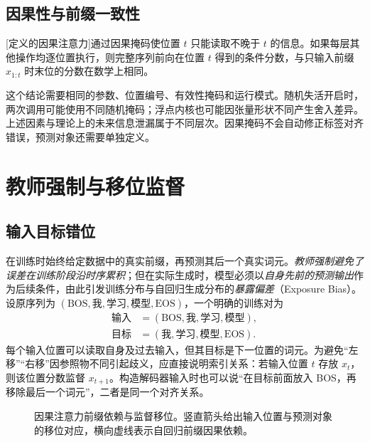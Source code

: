 \documentclass[../textbook.tex]{subfiles}
\begin{document}
\subsection{因果性与前缀一致性}
[定义的因果注意力]通过因果掩码使位置 $t$ 只能读取不晚于 $t$ 的信息。如果每层其他操作均逐位置执行，则完整序列前向在位置 $t$ 得到的条件分数，与只输入前缀 $x_{1:t}$ 时末位的分数在数学上相同。

这个结论需要相同的参数、位置编号、有效性掩码和运行模式。随机失活开启时，两次调用可能使用不同随机掩码；浮点内核也可能因张量形状不同产生舍入差异。上述因素与理论上的未来信息泄漏属于不同层次。因果掩码不会自动修正标签对齐错误，预测对象还需要单独定义。

\section{教师强制与移位监督}

\subsection{输入目标错位}
在训练时始终给定数据中的真实前缀，再预测其后一个真实词元。\emph{教师强制避免了误差在训练阶段沿时序累积}；但在实际生成时，模型必须以\emph{自身先前的预测输出}作为后续条件，由此引发训练分布与自回归生成分布的\emph{暴露偏差}（Exposure Bias）。设原序列为
$(\mathrm{BOS},\text{我},\text{学习},\text{模型},\mathrm{EOS})$，一个明确的训练对为
\begin{equation}
 \begin{aligned}
 \text{输入}&=(\mathrm{BOS},\text{我},\text{学习},\text{模型}),\\
 \text{目标}&=(\text{我},\text{学习},\text{模型},\mathrm{EOS}).
 \end{aligned}
\end{equation}
每个输入位置可以读取自身及过去输入，但其目标是下一位置的词元。为避免“左移”“右移”因参照物不同引起歧义，应直接说明索引关系：若输入位置 $t$ 存放 $x_t$，则该位置分数监督 $x_{t+1}$。构造解码器输入时也可以说“在目标前面放入 BOS，再移除最后一个词元”，二者是同一个对齐关系。

\begin{figure}[htbp]
\centering
{}
\caption[因果注意力前缀依赖与监督移位]{因果注意力前缀依赖与监督移位。竖直箭头给出输入位置与预测对象的移位对应，横向虚线表示自回归前缀因果依赖。}\label{fig:ar-shift}
\end{figure}
\end{document}
